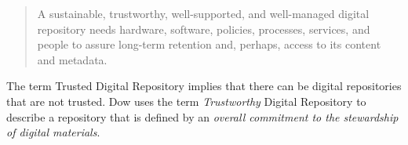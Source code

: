 \begin{quote}A sustainable, trustworthy, well-supported, and well-managed digital repository needs hardware, software, policies, processes, services, and people to assure long-term retention and, perhaps, access to its content and metadata.\cite{dow_elizabeth_2009} \end{quote}
The term Trusted Digital Repository implies that there can be digital repositories that are not trusted. Dow uses the term \emph{Trustworthy} Digital Repository to describe a repository that is defined by an \emph{overall commitment to the stewardship of digital materials}\cite{dow_elizabeth_2009}.